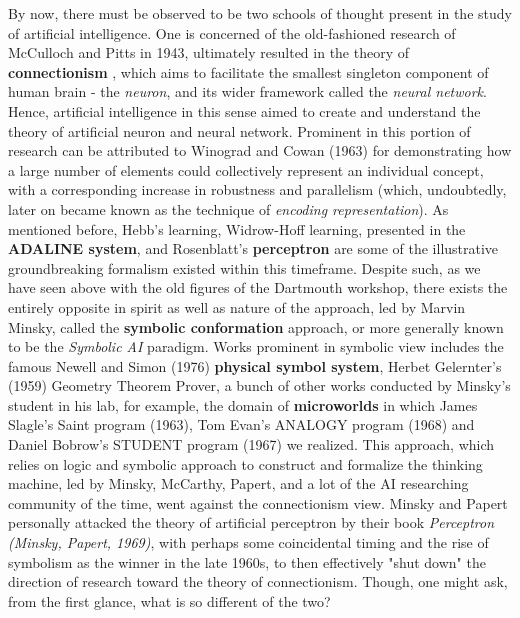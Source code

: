 By now, there must be observed to be two schools of thought present in the study of artificial intelligence. One is concerned of the old-fashioned research of McCulloch and Pitts in 1943, ultimately resulted in the theory of \textbf{connectionism} , which aims to facilitate the smallest singleton component of human brain - the \textit{neuron}, and its wider framework called the \textit{neural network}. Hence, artificial intelligence in this sense aimed to create and understand the theory of artificial neuron and neural network. Prominent in this portion of research can be attributed to Winograd and Cowan (1963) for demonstrating how a large number of elements could collectively represent an individual concept, with a corresponding increase in robustness and parallelism (which, undoubtedly, later on became known as the technique of \textit{encoding representation}). As mentioned before, Hebb's learning, Widrow-Hoff learning, presented in the \textbf{ADALINE system}, and Rosenblatt's \textbf{perceptron} are some of the illustrative groundbreaking formalism existed within this timeframe. Despite such, as we have seen above with the old figures of the Dartmouth workshop, there exists the entirely opposite in spirit as well as nature of the approach, led by Marvin Minsky, called the \textbf{symbolic conformation} approach, or more generally known to be the \textit{Symbolic AI} paradigm. Works prominent in symbolic view includes the famous Newell and Simon (1976) \textbf{physical symbol system}, Herbet Gelernter's (1959) Geometry Theorem Prover, a bunch of other works conducted by Minsky's student in his lab, for example, the domain of \textbf{microworlds} in which James Slagle's Saint program (1963), Tom Evan's ANALOGY program (1968) and Daniel Bobrow's STUDENT program (1967) we realized.  This approach, which relies on logic and symbolic approach to construct and formalize the thinking machine, led by Minsky, McCarthy, Papert, and a lot of the AI researching community of the time, went against the connectionism view. Minsky and Papert personally attacked the theory of artificial perceptron by their book \textit{Perceptron (Minsky, Papert, 1969)}, with perhaps some coincidental timing and the rise of symbolism as the winner in the late 1960s, to then effectively "shut down" the direction of research toward the theory of connectionism. Though, one might ask, from the first glance, what is so different of the two? 

